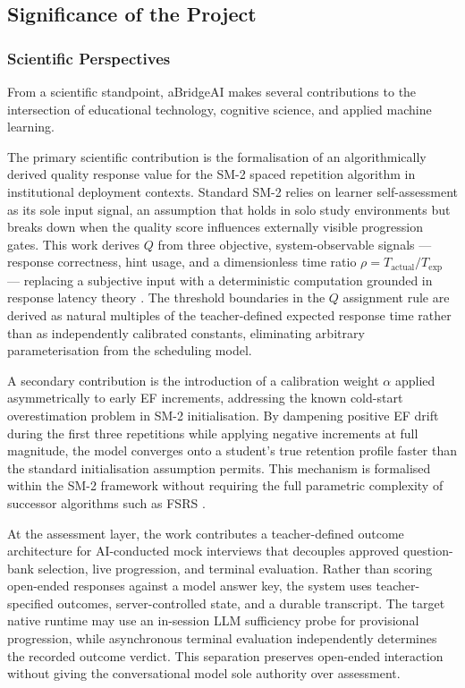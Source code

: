 \subsection{Significance of the Project}

\subsubsection{Scientific Perspectives}
From a scientific standpoint, aBridgeAI makes several contributions to the intersection of educational technology, cognitive science, and applied machine learning.

The primary scientific contribution is the formalisation of an algorithmically derived quality response value for the SM-2 spaced repetition algorithm in institutional deployment contexts. Standard SM-2 relies on learner self-assessment as its sole input signal, an assumption that holds in solo study environments but breaks down when the quality score influences externally visible progression gates. This work derives $Q$ from three objective, system-observable signals — response correctness, hint usage, and a dimensionless time ratio $\rho = T_{\text{actual}} / T_{\text{exp}}$ — replacing a subjective input with a deterministic computation grounded in response latency theory \cite{benjamin1996}. The threshold boundaries in the $Q$ assignment rule are derived as natural multiples of the teacher-defined expected response time rather than as independently calibrated constants, eliminating arbitrary parameterisation from the scheduling model.

A secondary contribution is the introduction of a calibration weight $\alpha$ applied asymmetrically to early EF increments, addressing the known cold-start overestimation problem in SM-2 initialisation. By dampening positive EF drift during the first three repetitions while applying negative increments at full magnitude, the model converges onto a student's true retention profile faster than the standard initialisation assumption permits. This mechanism is formalised within the SM-2 framework without requiring the full parametric complexity of successor algorithms such as FSRS \cite{ye2022fsrs}.

At the assessment layer, the work contributes a teacher-defined outcome architecture for AI-conducted mock interviews that decouples approved question-bank selection, live progression, and terminal evaluation. Rather than scoring open-ended responses against a model answer key, the system uses teacher-specified outcomes, server-controlled state, and a durable transcript. The target native runtime may use an in-session LLM sufficiency probe for provisional progression, while asynchronous terminal evaluation independently determines the recorded outcome verdict. This separation preserves open-ended interaction without giving the conversational model sole authority over assessment.

